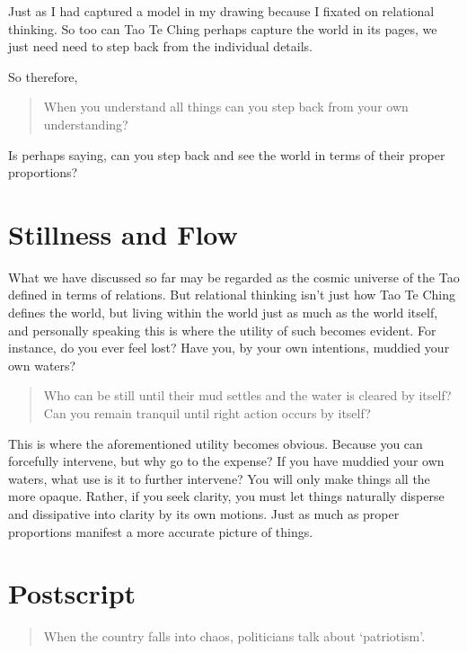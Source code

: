Just as I had captured a model in my drawing because I fixated on relational thinking. So too can Tao Te Ching perhaps capture the world in its pages, we just need need to step back from the individual details. 

So therefore, 
\begin{quotation}
    When you understand all things can you step back from your own understanding? 
\end{quotation}
Is perhaps saying, can you step back and see the world in terms of their proper proportions? 

\section{Stillness and Flow}

What we have discussed so far may be regarded as the cosmic universe of the Tao defined in terms of relations. But relational thinking isn’t just how Tao Te Ching defines the world, but living within the world just as much as the world itself, and personally speaking this is where the utility of such becomes evident. For instance, do you ever feel lost? Have you, by your own intentions, muddied your own waters?

\begin{quotation}
    Who can be still until their mud settles and the water is cleared by itself?
    Can you remain tranquil until right action occurs by itself? 
\end{quotation}

This is where the aforementioned utility becomes obvious. Because you can forcefully intervene, but why go to the expense? If you have muddied your own waters, what use is it to further intervene? You will only make things all the more opaque. Rather, if you seek clarity, you must let things naturally disperse and dissipative into clarity by its own motions. Just as much as proper proportions manifest a more accurate picture of things. 

\section{Postscript}

\begin{quotation}
When the country falls into chaos, politicians talk about `patriotism'.
\end{quotation}
